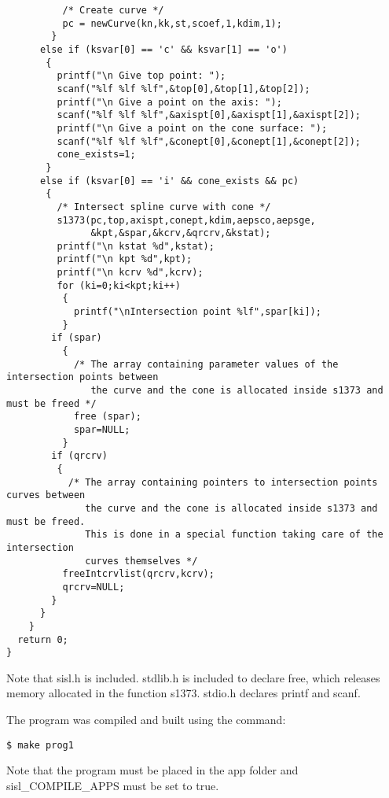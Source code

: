 \begin{verbatim}
          /* Create curve */
          pc = newCurve(kn,kk,st,scoef,1,kdim,1);
        }
      else if (ksvar[0] == 'c' && ksvar[1] == 'o')
       {
         printf("\n Give top point: ");
         scanf("%lf %lf %lf",&top[0],&top[1],&top[2]);
         printf("\n Give a point on the axis: ");
         scanf("%lf %lf %lf",&axispt[0],&axispt[1],&axispt[2]);
         printf("\n Give a point on the cone surface: ");
         scanf("%lf %lf %lf",&conept[0],&conept[1],&conept[2]);
         cone_exists=1;
       }
      else if (ksvar[0] == 'i' && cone_exists && pc)
       {
         /* Intersect spline curve with cone */
         s1373(pc,top,axispt,conept,kdim,aepsco,aepsge,
               &kpt,&spar,&kcrv,&qrcrv,&kstat);
         printf("\n kstat %d",kstat);
         printf("\n kpt %d",kpt);
         printf("\n kcrv %d",kcrv);
         for (ki=0;ki<kpt;ki++)
          {
            printf("\nIntersection point %lf",spar[ki]);
          }
        if (spar)
          {
            /* The array containing parameter values of the intersection points between
               the curve and the cone is allocated inside s1373 and must be freed */
            free (spar);
            spar=NULL;
          }
        if (qrcrv)
         {
           /* The array containing pointers to intersection points curves between
              the curve and the cone is allocated inside s1373 and must be freed.
              This is done in a special function taking care of the intersection
              curves themselves */
          freeIntcrvlist(qrcrv,kcrv);
          qrcrv=NULL;
        }
      }
    }
  return 0;
}

\end{verbatim}
Note that sisl.h is included. stdlib.h is included to declare free, which
releases memory allocated in the function s1373. stdio.h declares printf and
scanf.

\bigskip

The program was compiled and built using the command:
\begin{verbatim}
$ make prog1
\end{verbatim}
Note that the program must be placed in the app folder and sisl\_COMPILE\_APPS must be set to true.

